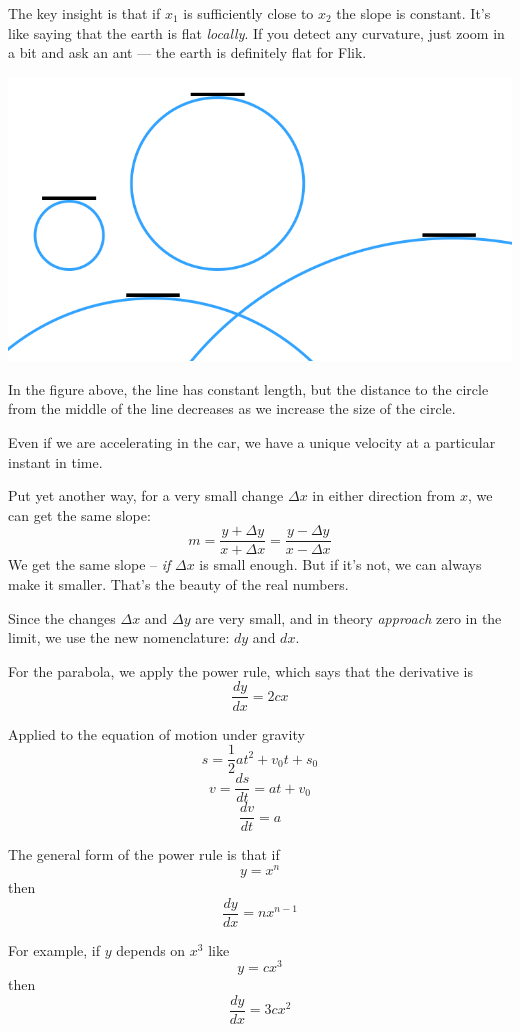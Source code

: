 \documentclass[11pt, oneside]{article}
\begin{document}
The key insight is that if $x_1$ is sufficiently close to $x_2$ the slope is constant.  It's like saying that the earth is flat \emph{locally}.  If you detect any curvature, just zoom in a bit and ask an ant --- the earth is definitely flat for Flik.
\begin{center} \includegraphics [scale=0.5] {line_circles.png} \end{center}
In the figure above, the line has constant length, but the distance to the circle from the middle of the line decreases as we increase the size of the circle.

Even if we are accelerating in the car, we have a unique velocity at a particular instant in time.

Put yet another way, for a very small change $\Delta x$ in either direction from $x$, we can get the same slope:
\[ m = \frac{y + \Delta y}{x + \Delta x} = \frac{y - \Delta y}{x - \Delta x}  \]
We get the same slope -- \emph{if} $\Delta x$ is small enough.  But if it's not, we can always make it smaller.  That's the beauty of the real numbers.

Since the changes $\Delta x$ and $\Delta y$ are very small, and in theory \emph{approach} zero in the limit, we use the new nomenclature:  $dy$ and $dx$.

For the parabola, we apply the power rule, which says that the derivative is
\[ \frac{dy}{dx} = 2cx \]

Applied to the equation of motion under gravity
\[ s = \frac{1}{2} a t^2 + v_0 t + s_0 \]
\[ v = \frac{ds}{dt} = at + v_0 \]
\[ \frac{dv}{dt} = a \]

The general form of the power rule is that if
\[ y = x^n \]
then
\[ \frac{dy}{dx} = n x^{n-1} \]

For example, if $y$ depends on $x^3$ like
\[ y = cx^3 \]
then
\[ \frac{dy}{dx} = 3cx^2 \]
\end{document}
